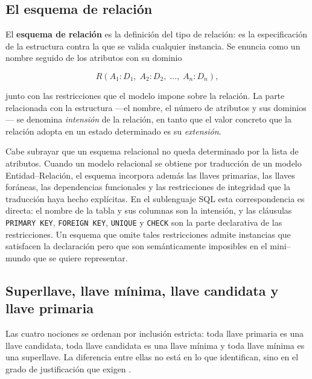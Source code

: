 \subsection{El esquema de relación}

El \textbf{esquema de relación} es la definición del tipo de relación: es la
especificación de la estructura contra la que se valida cualquier instancia.
Se enuncia como un nombre seguido de los atributos con su dominio

\begin{equation}
  R(A_1{:}D_1,\; A_2{:}D_2,\; \ldots,\; A_n{:}D_n),
\end{equation}

junto con las restricciones que el modelo impone sobre la relación. La parte
relacionada con la estructura ---el nombre, el número de atributos y sus
dominios--- se denomina \emph{intensión} de la relación, en tanto que el valor
concreto que la relación adopta en un estado determinado es su
\emph{extensión}.

Cabe subrayar que un esquema relacional no queda determinado por la lista de
atributos. Cuando un modelo relacional se obtiene por traducción de un modelo
Entidad--Relación, el esquema incorpora además las llaves primarias, las
llaves foráneas, las dependencias funcionales y las restricciones de
integridad que la traducción haya hecho explícitas. En el sublenguaje SQL esta
correspondencia es directa: el nombre de la tabla y sus columnas son la
intensión, y las cláusulas \texttt{PRIMARY KEY}, \texttt{FOREIGN KEY},
\texttt{UNIQUE} y \texttt{CHECK} son la parte declarativa de las
restricciones. Un esquema que omite tales restricciones admite instancias que
satisfacen la declaración pero que son semánticamente imposibles en el
mini--mundo que se quiere representar.

\subsection{Superllave, llave mínima, llave candidata y llave primaria}

Las cuatro nociones se ordenan por inclusión estricta: toda llave primaria es
una llave candidata, toda llave candidata es una llave mínima y toda llave
mínima es una superllave. La diferencia entre ellas no está en lo que
identifican, sino en el grado de justificación que exigen
\cite{elmasri2016fundamentals}.

